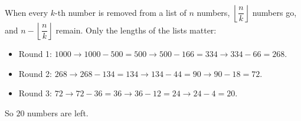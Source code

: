 When every $k$-th number is removed from a list of $n$ numbers, $\left\lfloor\dfrac{n}{k}\right\rfloor$ numbers go, and $n-\left\lfloor\dfrac{n}{k}\right\rfloor$ remain. Only the lengths of the lists matter:
\begin{itemize}
\item Round 1: $1000\to1000-500=500\to500-166=334\to334-66=268$.
\item Round 2: $268\to268-134=134\to134-44=90\to90-18=72$.
\item Round 3: $72\to72-36=36\to36-12=24\to24-4=20$.
\end{itemize}
So $\boxed{20}$ numbers are left.
